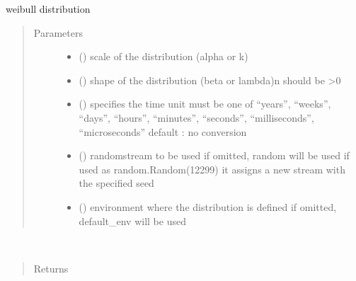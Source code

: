 \documentclass[letterpaper,10pt,english]{sphinxmanual}
\begin{document}

\begin{fulllineitems}
\label{\detokenize{Reference:salabim.Weibull}}
weibull distribution
\begin{quote}\begin{description}
\item[{Parameters}] \leavevmode\begin{itemize}
\item {} 
 () \textendash{} scale of the distribution (alpha or k)

\item {} 
 () \textendash{} shape of the distribution (beta or lambda)\textbar{}n\textbar{}
should be \textgreater{}0

\item {} 
 () \textendash{} specifies the time unit 
must be one of “years”, “weeks”, “days”, “hours”, “minutes”, “seconds”, “milliseconds”, “microseconds” 
default : no conversion 

\item {} 
 () \textendash{} randomstream to be used 
if omitted, random will be used 
if used as random.Random(12299)
it assigns a new stream with the specified seed

\item {} 
 ({\hyperref[\detokenize{Reference:salabim.Environment}]{}}) \textendash{} environment where the distribution is defined 
if omitted, default\_env will be used

\end{itemize}

\end{description}\end{quote}

\begin{fulllineitems}
\label{\detokenize{Reference:salabim.Weibull.mean}}~\begin{quote}\begin{description}
\item[{Returns}] \leavevmode
{}


\end{description}
\end{quote}
\end{fulllineitems}
\end{fulllineitems}
\end{document}
